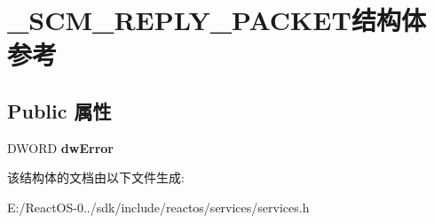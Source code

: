 \hypertarget{struct___s_c_m___r_e_p_l_y___p_a_c_k_e_t}{}\section{\+\_\+\+S\+C\+M\+\_\+\+R\+E\+P\+L\+Y\+\_\+\+P\+A\+C\+K\+E\+T结构体 参考}
\label{struct___s_c_m___r_e_p_l_y___p_a_c_k_e_t}
\subsection*{Public 属性}
\begin{DoxyCompactItemize}
\item 
\mbox{\label{struct___s_c_m___r_e_p_l_y___p_a_c_k_e_t_abbdf6d6ba4d02b89f110713020e7c3a6}} 
D\+W\+O\+RD {\bfseries dw\+Error}
\end{DoxyCompactItemize}


该结构体的文档由以下文件生成\+:\begin{DoxyCompactItemize}
\item 
E\+:/\+React\+O\+S-\/0../sdk/include/reactos/services/services.\+h\end{DoxyCompactItemize}

